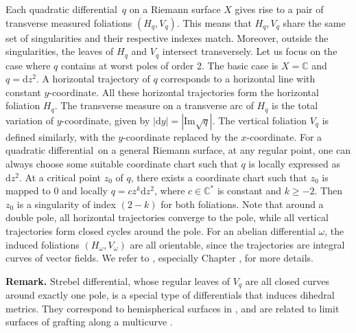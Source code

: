 \documentclass[pdflatex,sn-mathphys]{sn-jnl}%
\numberwithin{equation}{section}
\theoremstyle{thmstyleone}%
\newcommand{\CC}{\mathbb{C}}
\newcommand{\abs}[1]{\left\lvert #1 \right\rvert}
\newcommand{\mfoli}{measured foliation}
\newcommand{\qdf}{quadratic differential}
\begin{document}
\bigskip
Each \qdf\ $q$ on a Riemann surface $X$ gives rise to a pair of transverse \mfoli s $(H_q, V_q)$. This means that $H_q, V_q$ share the same set of singularities and their respective indexes match. Moreover, outside the singularities, the leaves of $H_q$ and $V_q$ intersect transversely. 
Let us focus on the case where $q$ contains at worst poles of order 2. 
The basic case is $X=\CC$ and $q=\mathrm{d}z^2$. A horizontal trajectory of $q$ corresponds to a horizontal line with constant $y$-coordinate. All these horizontal trajectories form the horizontal foliation $H_q$. The transverse measure on a transverse arc of $H_q$ is the total variation of $y$-coordinate, given by $\abs{\mathrm{d}y}=\abs{\mathrm{Im}\sqrt{q}}$. The vertical foliation $V_q$ is defined similarly, with the $y$-coordinate replaced by the $x$-coordinate. 
For a \qdf\ on a general Riemann surface, at any regular point, one can always choose some suitable coordinate chart such that $q$ is locally expressed as $\mathrm{d}z^2$. 
At a critical point $z_0$ of $q$, there exists a coordinate chart such that $z_0$ is mapped to $0$ and locally $q=c z^k\mathrm{d}z^2$, where $c\in\CC^*$ is constant and $k\geq-2$. Then $z_0$ is a singularity of index $(2-k)$ for both foliations.
Note that around a double pole, all horizontal trajectories converge to the pole, while all vertical trajectories form closed cycles around the pole. %
For an abelian differential $\omega$, the induced foliations $(H_\omega, V_\omega)$ are all orientable, since the trajectories are integral curves of vector fields.
We refer to \cite{Strebel}, especially Chapter \uppercase\expandafter{}, for more details.

\textbf{Remark.} Strebel differential, whose regular leaves of $V_q$ are all closed curves around exactly one pole, is a special type of differentials that induces dihedral metrics. They correspond to hemispherical surfaces in \cite[Section 2.5]{GT23}, and are related to limit surfaces of grafting along a multicurve \cite[Section 5.2]{Gup14}.
\end{document}
